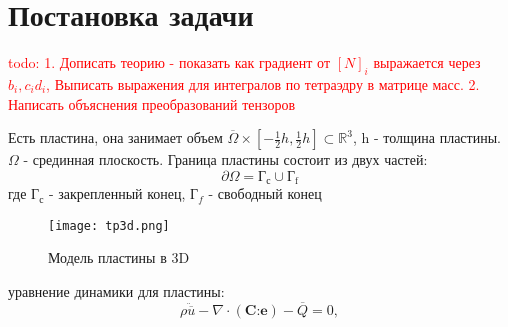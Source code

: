 \documentclass[a4paper,12pt]{article}
\begin{document}
\section{Постановка задачи}
\textcolor{red}{todo:
1. Дописать теорию - показать как градиент от $[N]_i$ выражается через $b_i, c_i d_i$, Выписать выражения для интегралов по тетраэдру в матрице масс.
2. Написать объяснения преобразований тензоров} \par
Есть пластина, она занимает объем $\overline{\Omega} \times [-\frac{1}{2}h, \frac{1}{2}h] \subset \mathbb{R}^3$, h - толщина пластины. $\Omega$ - срединная плоскость. Граница пластины состоит из двух частей:
\begin{equation}
    \partial \Omega = \text{Г}_{\text{с}} \cup \text{Г}_{\text{f}}
\end{equation}
где $\text{Г}_{\text{с}}$ - закрепленный конец, $\text{Г}_f$ - свободный конец
\begin{figure}[H]
	\begin{center}
		\texttt{[image: tp3d.png]}
		\caption{Модель пластины в 3D}
	\end{center}
\end{figure}


уравнение динамики для пластины: 
\begin{equation}
\rho\ddot{\overline{u}} -  \nabla \cdot ( \textbf{C:e}) - \overline{Q} = 0,
\end{equation}
\end{document}
